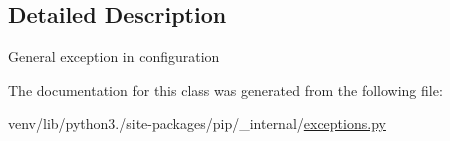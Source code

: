 \subsection{Detailed Description}
\begin{DoxyVerb}General exception in configuration\end{DoxyVerb}
 

The documentation for this class was generated from the following file\+:\begin{DoxyCompactItemize}
\item 
venv/lib/python3./site-\/packages/pip/\+\_\+internal/\hyperlink{pip_2__internal_2exceptions_8py}{exceptions.\+py}\end{DoxyCompactItemize}
